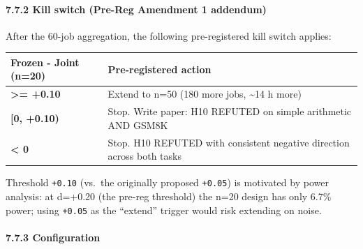 \documentclass[
]{article}
\newcounter{none} %
\begin{document}
\paragraph{7.7.2 Kill switch (Pre-Reg Amendment 1
addendum)}\label{kill-switch-pre-reg-amendment-1-addendum}

After the 60-job aggregation, the following pre-registered kill switch
applies:

{\def\LTcaptype{none} %
\begin{longtable}[]{@{}
  >{\raggedright\arraybackslash}p{}
  >{\raggedright\arraybackslash}p{}@{}}
\toprule\noalign{}
\begin{minipage}[b]{\linewidth}\raggedright
Frozen - Joint (n=20)
\end{minipage} & \begin{minipage}[b]{\linewidth}\raggedright
Pre-registered action
\end{minipage} \\
\midrule\noalign{}
\endhead
\bottomrule\noalign{}
\endlastfoot
\textbf{\textgreater= +0.10} & Extend to n=50 (180 more jobs,
\textasciitilde14 h more) \\
\textbf{{[}0, +0.10)} & Stop. Write paper: H10 REFUTED on simple
arithmetic AND GSM8K \\
\textbf{\textless{} 0} & Stop. H10 REFUTED with consistent negative
direction across both tasks \\
\end{longtable}
}

Threshold \texttt{+0.10} (vs.~the originally proposed \texttt{+0.05}) is
motivated by power analysis: at d=+0.20 (the pre-reg threshold) the n=20
design has only 6.7\% power; using \texttt{+0.05} as the ``extend''
trigger would risk extending on noise.

\paragraph{7.7.3 Configuration}\label{configuration}
\end{document}
